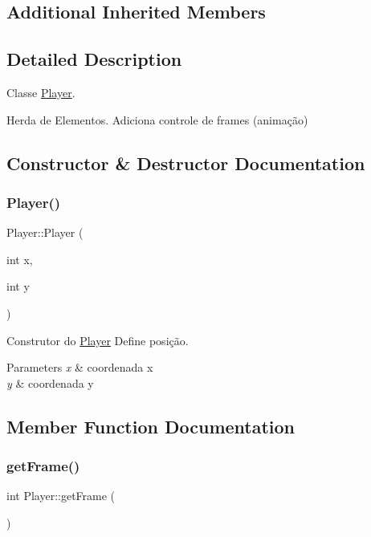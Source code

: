 \subsection*{Additional Inherited Members}


\subsection{Detailed Description}
Classe \hyperlink{classPlayer}{Player}. 

Herda de Elementos. Adiciona controle de frames (animação) 

\subsection{Constructor \& Destructor Documentation}
\mbox{\label{classPlayer_a9b009cc0bebdcc27a837d50b1f4ededd}} 
\subsubsection{\texorpdfstring{Player()}{Player()}}
{\footnotesize\ttfamily Player\+::\+Player (\begin{DoxyParamCaption}\item[{int}]{x,  }\item[{int}]{y }\end{DoxyParamCaption})}



Construtor do \hyperlink{classPlayer}{Player} Define posição. 


\begin{DoxyParams}{Parameters}
{\em x} & coordenada x \\
\hline
{\em y} & coordenada y \\
\hline
\end{DoxyParams}


\subsection{Member Function Documentation}
\mbox{\label{classPlayer_a73374c899105e2ba7fab9340d279e3a0}} 
\subsubsection{\texorpdfstring{get\+Frame()}{getFrame()}}
{\footnotesize\ttfamily int Player\+::get\+Frame (\begin{DoxyParamCaption}{ }\end{DoxyParamCaption})}


